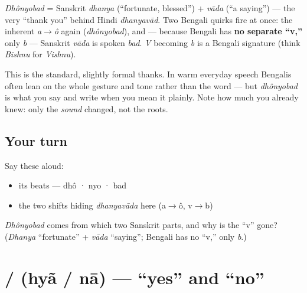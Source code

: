 \begin{cousinweb}
\emph{Dhônyobad} = Sanskrit \emph{dhanya} (\textquotedblleft{}fortunate, blessed\textquotedblright{}) + \emph{vāda} (\textquotedblleft{}a saying\textquotedblright{}) — the very \textquotedblleft{}thank you\textquotedblright{} behind Hindi \emph{dhanyavād}. Two Bengali quirks fire at once: the inherent \emph{a$\to$ô} again (\emph{dhônyobad}), and — because Bengali has \textbf{no separate \textquotedblleft{}v,\textquotedblright{}} only \emph{b} — Sanskrit \emph{vāda} is spoken \emph{bad}. \emph{V} becoming \emph{b} is a Bengali signature (think \emph{Bishnu} for \emph{Vishnu}).
\end{cousinweb}

\begin{culture}
This is the standard, slightly formal thanks. In warm everyday speech Bengalis often lean on the whole gesture and tone rather than the word — but \emph{dhônyobad} is what you say and write when you mean it plainly. Note how much you already knew: only the \emph{sound} changed, not the roots.
\end{culture}

\subsection*{Your turn}
Say these aloud:

\begin{itemize}
\raggedright
  \item its beats — dhô · nyo · bad
  \item the two shifts hiding \emph{dhanyavāda} here (a$\to$ô, v$\to$b)
\end{itemize}

\begin{tcolorbox}[breakable,colback=teal!4,colframe=teal!35!black,title={Before you move on}]
\emph{Dhônyobad} comes from which two Sanskrit parts, and why is the \textquotedblleft{}v\textquotedblright{} gone? (\emph{Dhanya} \textquotedblleft{}fortunate\textquotedblright{} + \emph{vāda} \textquotedblleft{}saying\textquotedblright{}; Bengali has no \textquotedblleft{}v,\textquotedblright{} only \emph{b}.)
\end{tcolorbox}
\section[\texorpdfstring{\bn{হ্যাঁ} / \bn{না} (hyã / nā)}{হ্যাঁ / না (hyã / nā)}]{ /  (hyã / nā) — \textquotedblleft{}yes\textquotedblright{} and \textquotedblleft{}no\textquotedblright{}}

